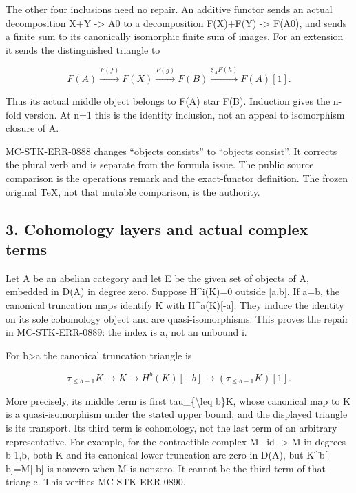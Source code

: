 The other four inclusions need no repair. An additive functor sends an actual decomposition X\allowbreak{}+Y \allowbreak{}-> A0 to a decomposition F(X)\allowbreak{}\allowbreak{}+F(Y)\allowbreak{} \allowbreak{}-> F(A0)\allowbreak{},\allowbreak{} and sends a finite sum to its canonically isomorphic finite sum of images. For an extension it sends the distinguished triangle to

\[
 F(A)\xrightarrow{F(f)}F(X)\xrightarrow{F(g)}F(B)
       \xrightarrow{\xi_A F(h)}F(A)[1].
\]

Thus its actual middle object belongs to F(A)\allowbreak{} star F(B)\allowbreak{}. Induction gives the n-fold version. At n\allowbreak{}=1 this is the identity inclusion,\allowbreak{} not an appeal to isomorphism closure of A.

MC-STK-ERR-0888 changes ``objects consists'' to ``objects consist''. It corrects the plural verb and is separate from the formula issue. The public source comparison is \href{https://stacks.math.columbia.edu/tag/0FX5}{the operations remark} and \href{https://stacks.math.columbia.edu/tag/05QK}{the exact-functor definition}. The frozen original TeX,\allowbreak{} not that mutable comparison,\allowbreak{} is the authority.

\subsection{3. Cohomology layers and actual complex terms}\label{proofs-10691-11108-cohomology-layers-and-actual-complex-terms}

Let A be an abelian category and let E be the given set of objects of A,\allowbreak{} embedded in D(A)\allowbreak{} in degree zero. Suppose H\textasciicircum{}i(K)\allowbreak{}\allowbreak{}=0 outside [a,\allowbreak{}b]\allowbreak{}. If a\allowbreak{}=b,\allowbreak{} the canonical truncation maps identify K with H\textasciicircum{}a(K)\allowbreak{}[-a]\allowbreak{}. They induce the identity on its sole cohomology object and are quasi-isomorphisms. This proves the repair in MC-STK-ERR-0889:\allowbreak{} the index is a,\allowbreak{} not an unbound i.

For b\textgreater a the canonical truncation triangle is

\[
 \tau_{\leq b-1}K\longrightarrow K\longrightarrow H^b(K)[-b]
                 \longrightarrow(\tau_{\leq b-1}K)[1].
\]

More precisely,\allowbreak{} its middle term is first tau\_\allowbreak{}\{\textbackslash{}leq b\}K,\allowbreak{} whose canonical map to K is a quasi-isomorphism under the stated upper bound,\allowbreak{} and the displayed triangle is its transport. Its third term is cohomology,\allowbreak{} not the last term of an arbitrary representative. For example,\allowbreak{} for the contractible complex M --id-\allowbreak{}-> M in degrees b-1,\allowbreak{}b,\allowbreak{} both K and its canonical lower truncation are zero in D(A)\allowbreak{},\allowbreak{} but K\textasciicircum{}b[-b]\allowbreak{}\allowbreak{}=M[-b]\allowbreak{} is nonzero when M is nonzero. It cannot be the third term of that triangle. This verifies MC-STK-ERR-0890.

